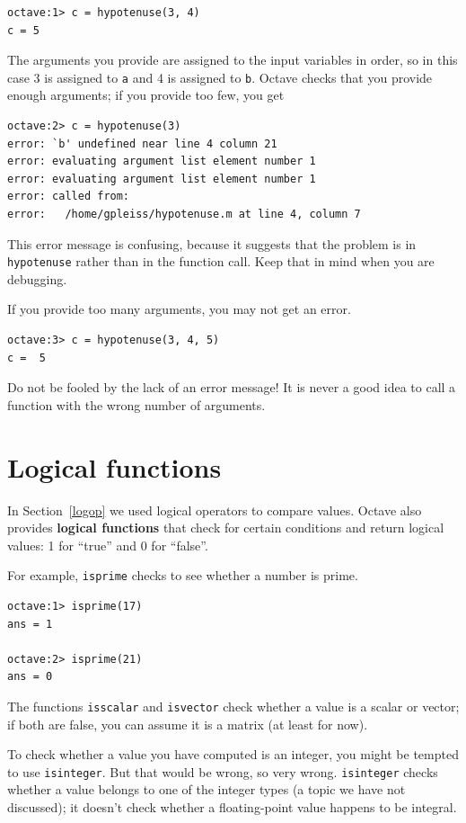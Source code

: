 \documentclass{book}
\begin{document}
\begin{verbatim}
octave:1> c = hypotenuse(3, 4)
c = 5
\end{verbatim}

The arguments you provide are assigned to the input variables in
order, so in this case 3 is assigned to {\tt a} and 4 is assigned to
{\tt b}. Octave checks that you provide enough arguments;
if you provide too few, you get

\begin{verbatim}
octave:2> c = hypotenuse(3)
error: `b' undefined near line 4 column 21
error: evaluating argument list element number 1
error: evaluating argument list element number 1
error: called from:
error:   /home/gpleiss/hypotenuse.m at line 4, column 7
\end{verbatim}

This error message is confusing, because it suggests that
the problem is in {\tt hypotenuse} rather than in the function call.
Keep that in mind when you are debugging.

If you provide too many arguments, you may not get an error.

\begin{verbatim}
octave:3> c = hypotenuse(3, 4, 5)
c =  5
\end{verbatim}

Do not be fooled by the lack of an error message! It is never a good idea to
call a function with the wrong number of arguments.


\section{Logical functions}

In Section~\ref{logop} we used logical operators to compare values.
Octave also provides {\bf logical functions} that check for certain
conditions and return logical values: 1 for ``true'' and 0 for ``false''.

For example, {\tt isprime} checks to see whether a number is prime.

\begin{verbatim}
octave:1> isprime(17)
ans = 1

octave:2> isprime(21)
ans = 0
\end{verbatim}

The functions {\tt isscalar} and {\tt isvector} check whether
a value is a scalar or vector; if both are false, you can assume
it is a matrix (at least for now).

To check whether a value you have computed is an integer, you might
be tempted to use {\tt isinteger}. But that would be wrong, so very
wrong. {\tt isinteger} checks whether a value belongs to one of
the integer types (a topic we have not discussed); it doesn't check
whether a floating-point value happens to be integral.
\end{document}
